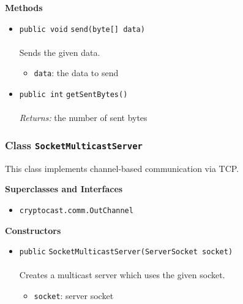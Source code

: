 \textbf{\sffamily Methods}
\begin{itemize}
\item \lstinline|public void| \lstinline|send|\lstinline|(byte[] data)|\\ \\[-0.6em]
Sends the given data.
\begin{itemize}
\item \lstinline|data|: the data to send
\end{itemize}



\item \lstinline|public int| \lstinline|getSentBytes|\lstinline|()|\\ \\[-0.6em]
\emph{Returns:} the number of sent bytes



\end{itemize}

\subsubsection{Class \lstinline|SocketMulticastServer|}
This class implements channel-based communication via TCP. \\
\noindent\begin{minipage}[t]{5cm}
\vspace{0.3em}
\hspace*{2em}
\vspace{0.3em}
\end{minipage}



\textbf{\sffamily Superclasses and Interfaces}
\begin{itemize}
\item \lstinline|cryptocast.comm.OutChannel|
\end{itemize}


\textbf{\sffamily Constructors}
\begin{itemize}
\item \lstinline|public| \lstinline|SocketMulticastServer|\lstinline|(ServerSocket socket)|\\ \\[-0.6em]
Creates a multicast server which uses the given socket.
\begin{itemize}
\item \lstinline|socket|: server socket
\end{itemize}



\end{itemize}


